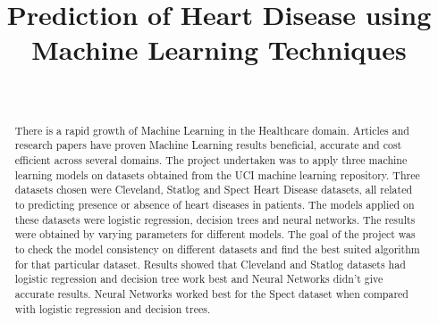 \documentclass[conference]{IEEEtran}
\begin{document}
\title{Prediction of Heart Disease using Machine Learning Techniques}

\author{
\\   %

}
\maketitle
\begin{abstract}
There is a rapid growth of Machine Learning in the Healthcare domain. Articles and research papers have proven Machine Learning results beneficial, accurate and cost efficient across several domains. The project undertaken was to apply three machine learning models on datasets obtained from the UCI machine learning repository. Three datasets chosen were Cleveland, Statlog and Spect Heart Disease datasets, all related to predicting presence or absence of heart diseases in patients. The models applied on these datasets were logistic regression, decision trees and neural networks. The results were obtained by varying parameters for different models. The goal of the project was to check the model consistency on different datasets and find the best suited algorithm for that particular dataset. Results showed that Cleveland and Statlog datasets had logistic regression and decision tree work best and Neural Networks didn’t give accurate results. Neural Networks worked best for the Spect dataset when compared with logistic regression and decision trees.
\end{abstract}


\IEEEpeerreviewmaketitle
\end{document}

